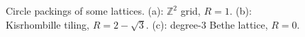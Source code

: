 \begin{figure}
\begin{minipage}{0.32\textwidth}
{\begin{tikzpicture}
\end{tikzpicture}
}
\end{minipage}
\par
\begin{minipage}{0.32\textwidth}
\centering
\caption*{(a)}
\end{minipage}
\begin{minipage}{0.32\textwidth}
\centering
\caption*{(b)}
\end{minipage}
\begin{minipage}{0.32\textwidth}
\centering
\caption*{(c)}
\end{minipage}

\caption{Circle packings of some lattices. (a): $\mathbb{Z}^2$ grid, $R=1$. (b): Kisrhombille tiling, $R=2-\sqrt{3}$. (c): degree-$3$ Bethe lattice, $R=0$.}
\label{fig:packing}
\end{figure}
